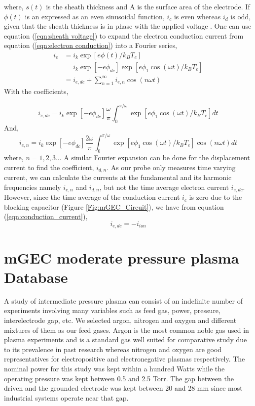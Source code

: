 \documentclass[12pt]{iopart}
\begin{document}
where, $s\left(t\right)$ is the sheath thickness and A is the surface area of the electrode. If $\phi\left(t\right)$ is an expressed as an even sinusoidal function, $i_c$ is even whereas $i_d$ is odd, given that the sheath thickness is in phase with the applied voltage \cite{panagopoulos1999plasma}. One can use equation (\ref{eqn:sheath voltage}) to expand the electron conduction current from equation (\ref{eqn:electron conduction}) into a Fourier series,
\begin{eqnarray} 
    i_e &= i_k\exp[e\phi\left(t\right)/k_B T_e] \\
    &= i_k\exp [-e\phi_{dc}] \exp[ e\phi_1\cos(\omega t)/k_B T_e] \\
    &= i_{e,dc} + \sum^{\infty}_{n=1} i_{e,n} \cos(n\omega t)
\end{eqnarray}
With the coefficients, 

\begin{equation} 
    i_{e,dc} =  i_k \exp [-e\phi_{dc}] \frac{\omega}{\pi} \int^{\pi/\omega}_0 \exp[e\phi_1\cos(\omega t)/k_B T_e] dt
\end{equation}
And,
\begin{equation} 
    i_{e,n} = i_k \exp [-e\phi_{dc}]\frac{2\omega}{\pi} \int^{\pi/\omega}_0 \exp[e\phi_1\cos(\omega t)/k_B T_e] \cos(n\omega t) dt
\end{equation}
where, $n = 1,2,3..$. A similar Fourier expansion can be done for the displacement current to find the coefficient, $i_{d,n}$. As our probe only measures time varying current, we can calculate the currents at the fundamental and its harmonic frequencies namely $i_{e,n}$ and $i_{d,n}$, but not the time average electron current $i_{e,dc}$. However, since the time average of the conduction current $i_c$ is zero due to the blocking capacitor (Figure \ref{Fig:mGEC_Circuit}), we have from equation (\ref{eqn:conduction_current}),
\begin{equation}
i_{e,dc} = -i_{ion}
\end{equation}


\section{mGEC moderate pressure plasma Database}\label{Sect:Database}

A study of intermediate pressure plasma can consist of an indefinite number of experiments involving many variables such as feed gas, power, pressure, interelectrode gap, etc. We selected argon, nitrogen and oxygen and different mixtures of them as our feed gases. Argon is the most common noble gas used in plasma experiments and is a standard gas well suited for comparative study due to its prevalence in past research whereas nitrogen and oxygen are good representatives for electropositive and electronegative plasmas respectively. The nominal power for this study was kept within a hundred Watts while the operating pressure was kept between 0.5 and 2.5 Torr. The gap between the driven and the grounded electrode was kept between 20 and 28 mm since most industrial systems operate near that gap.
\end{document}
